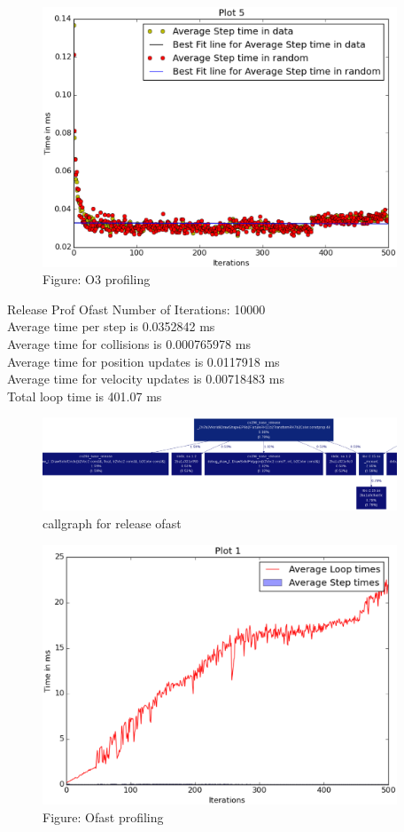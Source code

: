 \documentclass[english, 11pt]{article}
\begin{document}
\begin{figure}
	\begin{center}
		\includegraphics[width=400px]{g02_lab09_plot05}
	\end{center}
	\caption{Figure: O3 profiling}
\end{figure}

Release Prof Ofast
Number of Iterations: 10000\\
Average time per step is 0.0352842 ms\\
Average time for collisions is 0.000765978 ms\\
Average time for position updates is 0.0117918 ms\\
Average time for velocity updates is 0.00718483 ms\\
Total loop time is 401.07 ms\\

\begin{figure}
	\begin{center}
		\includegraphics[width=400px]{output_release_0fast}
	\end{center}
	\caption{callgraph for release ofast}
\end{figure}

\begin{figure}
	\begin{center}
		\includegraphics[width=400px]{ofast1}
	\end{center}
	\caption{Figure: Ofast profiling}
\end{figure}
\end{document}

